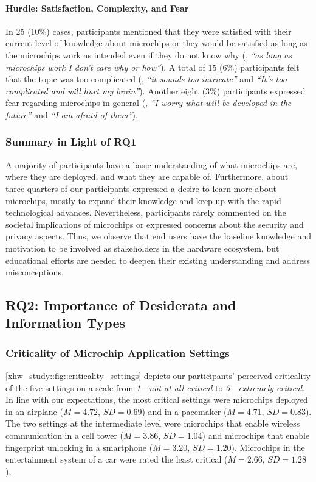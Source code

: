 \paragraph{Hurdle: Satisfaction, Complexity, and Fear}
In 25 (10\%) cases, participants mentioned that they were satisfied with their current level of knowledge about microchips or they would be satisfied as long as the microchips work as intended even if they do not know why (\eg, \textit{\enquote{as long as microchips work I don't care why or how}}). 
A total of 15 (6\%) participants felt that the topic was too complicated (\eg, \textit{\enquote{it sounds too intricate}} and \textit{\enquote{It's too complicated and will hurt my brain}}). 
Another eight (3\%) participants expressed fear regarding microchips in general (\eg,  \textit{\enquote{I worry what will be developed in the future}} and \textit{\enquote{I am afraid of them}}).

\begin{tcolorbox}
\subsubsection*{Summary in Light of RQ1}
\label{xhw_study::subsubsec::revisiting_rq1}
A majority of participants have a basic understanding of what microchips are, where they are deployed, and what they are capable of.
Furthermore, about three-quarters of our participants expressed a desire to learn more about microchips, mostly to expand their knowledge and keep up with the rapid technological advances.
Nevertheless, participants rarely commented on the societal implications of microchips or expressed concerns about the security and privacy aspects.
Thus, we observe that end users have the baseline knowledge and motivation to be involved as stakeholders in the hardware ecosystem, but educational efforts are needed to deepen their existing understanding and address misconceptions.
\end{tcolorbox}

\subsection{RQ2: Importance of Desiderata and Information Types}
\label{xhw_study::subsec::descriptive}

\subsubsection{Criticality of Microchip Application Settings}
\label{xhw_study::subsubsec::setting_criticality}
\autoref{xhw_study::fig::criticality_settings} depicts our participants' perceived criticality of the five settings on a scale from \textit{1---not at all critical} to \textit{5---extremely critical}.
In line with our expectations, the most critical settings were microchips deployed in an airplane ($M$$=$$4.72$, $SD$$=$$0.69$) and in a pacemaker ($M$$=$$4.71$, $SD$$=$$0.83$).
The two settings at the intermediate level were microchips that enable wireless communication in a cell tower ($M$$=$$3.86$, $SD$$=$$1.04$) and microchips that enable fingerprint unlocking in a smartphone ($M$$=$$3.20$, $SD$$=$$1.20$).
Microchips in the entertainment system of a car were rated the least critical ($M$$=$$2.66$, $SD$$=$$1.28$). 

